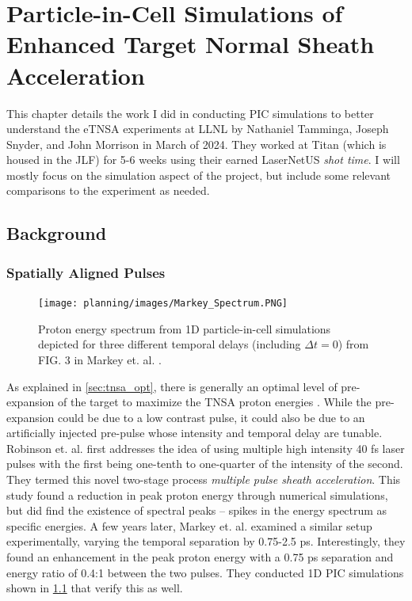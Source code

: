 \chapter{Particle-in-Cell Simulations of Enhanced Target Normal Sheath Acceleration} \label{ch:4}

This chapter details the work I did in conducting \gls{PIC} simulations to better understand the \gls{eTNSA} experiments at \gls{LLNL} by Nathaniel Tamminga, Joseph Snyder, and John Morrison in March of 2024. They worked at Titan (which is housed in the \gls{JLF}) for 5-6 weeks using their earned LaserNetUS \emph{shot time}. I will mostly focus on the simulation aspect of the project, but include some relevant comparisons to the experiment as needed. 

\section{Background}

\subsection{Spatially Aligned Pulses} \label{sec:spatialalign}

\begin{figure}
	\centering 
	\texttt{[image: planning/images/Markey\_Spectrum.PNG]}
	\caption{Proton energy spectrum from 1D particle-in-cell simulations depicted for three different temporal delays (including $\Delta t = 0$) from FIG. 3 in Markey et. al. \cite{Markey_2010_PRL}.}
	\label{fig:markey_spectrum}
\end{figure}

As explained in \cref{sec:tnsa_opt}, there is generally an optimal level of pre-expansion of the target to maximize the \gls{TNSA} proton energies \cite{McKenna_2008_LaPB,Fuchs_2007_PRL}. While the pre-expansion could be due to a low contrast pulse, it could also be due to an artificially injected pre-pulse whose intensity and temporal delay are tunable. Robinson et. al. \cite{Robinson_2007_PPCF} first addresses the idea of using multiple high intensity 40 fs laser pulses with the first being one-tenth to one-quarter of the intensity of the second. They termed this novel two-stage process \emph{multiple pulse sheath acceleration}. This study found a reduction in peak proton energy through numerical simulations, but did find the existence of spectral peaks -- spikes in the energy spectrum as specific energies. A few years later, Markey et. al. \cite{Markey_2010_PRL} examined a similar setup experimentally, varying the temporal separation by 0.75-2.5 ps. Interestingly, they found an enhancement in the peak proton energy with a 0.75 ps separation and energy ratio of 0.4:1 between the two pulses. They conducted 1D PIC simulations shown in \cref{fig:markey_spectrum} that verify this as well.

